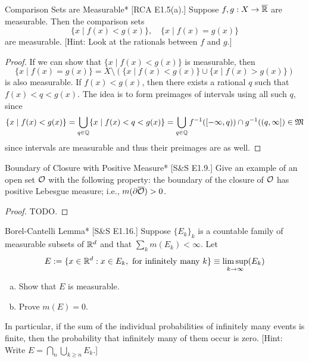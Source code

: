 \begin{problem}{Comparison Sets are Measurable}*
    [RCA E1.5(a).] Suppose \(f,g : X \to \overline{\mathbb{R}}\) are measurable. Then the comparison sets 
    \[
        \{x \mid f(x) < g(x)\}, \quad \{x \mid f(x) = g(x)\}
    \]
    are measurable. [Hint: Look at the rationals between \(f\) and \(g\).]
\end{problem}

\begin{proof}
    If we can show that \(\{x \mid f(x) < g(x)\}\) is measurable, then 
    \[
        \{x \mid f(x) = g(x)\} = X \setminus (\{x \mid f(x) < g(x)\} \cup \{x \mid f(x) > g(x)\})
    \] 
    is also measurable. If \(f(x) < g(x)\), then there exists a rational \(q\) such that \(f(x) < q < g(x)\). The idea is to form preimages of intervals using all such \(q\), since 
    \[
    \{x \mid f(x) < g(x) \}
    = \bigcup_{q \in \mathbb{Q}} \{x \mid f(x) < q < g(x)\}
    = \bigcup_{q \in \mathbb{Q}} f^{-1}([-\infty, q)) \cap g^{-1}((q, \infty])
    \in \mathfrak{M}
    \]
    since intervals are measurable and thus their preimages are as well. 
\end{proof}

\begin{problem}{Boundary of Closure with Positive Measure}*
    [S\&S E1.9.] Give an example of an open set \(\mathcal{O}\) with the following property: the boundary of the closure of \(\mathcal{O}\) has positive Lebesgue measure; i.e., \(m(\partial \overline{\mathcal{O}}) > 0\). 
\end{problem}

\begin{proof}
    TODO. 
\end{proof}

\begin{problem}{Borel-Cantelli Lemma}*
    [S\&S E1.16.] Suppose \(\{E_k\}_k\) is a countable family of measurable subsets of \(\mathbb{R}^d\) and that \(\sum_k m(E_k) < \infty\). Let 
    \[
    E := \{x \in \mathbb{R}^d : x \in E_k, \text{ for infinitely many } k\}
    \equiv \limsup_{k \to \infty} (E_k)
    \]
    \begin{enumerate}[(a)]
        \itemsep0em
        \item Show that \(E\) is measurable. 
        \item Prove \(m(E) = 0\). 
    \end{enumerate}
    In particular, if the sum of the individual probabilities of infinitely many events is finite, then the probability that infinitely many of them occur is zero. [Hint: Write \(E = \bigcap_n \bigcup_{k \geq n} E_k\).]
\end{problem}

